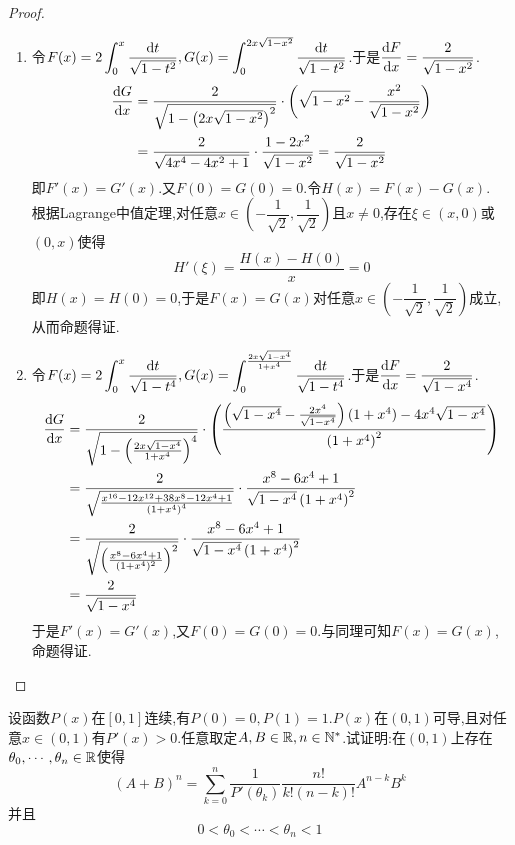 \documentclass{ctexart}
\begin{document}
\begin{proof}
    \begin{enumerate}[label=\tbf{(\arabic*)}]
        \item 令$\displaystyle F(x)=2\int_0^x\dfrac{\mathrm{d} t}{\sqrt{1-t^2}},G(x)=\int_0^{2x\sqrt{1-x^2}}\dfrac{\mathrm{d} t}{\sqrt{1-t^2}}$.于是$\dfrac{\mathrm{d} F}{\mathrm{d} x}=\dfrac{2}{\sqrt{1-x^2}}$.
            \[\begin{aligned}
                \dfrac{\mathrm{d} G}{\mathrm{d} x}
                &= \dfrac{2}{\sqrt{1-\left(2x\sqrt{1-x^2}\right)^2}}\cdot\left(\sqrt{1-x^2}-\dfrac{x^2}{\sqrt{1-x^2}}\right) \\
                &= \dfrac{2}{\sqrt{4x^4-4x^2+1}}\cdot\dfrac{1-2x^2}{\sqrt{1-x^2}}=\dfrac{2}{\sqrt{1-x^2}}
            \end{aligned}\]
            即$F'(x)=G'(x)$.又$F(0)=G(0)=0$.令$H(x)=F(x)-G(x)$.\\
            根据Lagrange中值定理,对任意$x\in\left(-\dfrac{1}{\sqrt2},\dfrac{1}{\sqrt2}\right)$且$x\neq0$,存在$\xi\in(x,0)$或$(0,x)$使得
            \[H'(\xi)=\dfrac{H(x)-H(0)}{x}=0\]
            即$H(x)=H(0)=0$,于是$F(x)=G(x)$对任意$x\in\left(-\dfrac{1}{\sqrt2},\dfrac{1}{\sqrt2}\right)$成立,从而命题得证.
        \item 令$\displaystyle F(x)=2\int_0^x\dfrac{\mathrm{d} t}{\sqrt{1-t^4}},G(x)=\int_{0}^{\frac{2x\sqrt{1-x^4}}{1+x^4}}\dfrac{\mathrm{d} t}{\sqrt{1-t^4}}$.于是$\dfrac{\mathrm{d} F}{\mathrm{d} x}=\dfrac{2}{\sqrt{1-x^4}}$.
            \[\begin{aligned}
                \dfrac{\mathrm{d} G}{\mathrm{d} x}
                &= \dfrac{2}{\sqrt{1-\left(\frac{2x\sqrt{1-x^4}}{1+x^4}\right)^4}}\cdot\left(\dfrac{\left(\sqrt{1-x^4}-\frac{2x^4}{\sqrt{1-x^4}}\right)(1+x^4)-4x^4\sqrt{1-x^4}}{\left(1+x^4\right)^2}\right) \\
                &= \dfrac{2}{\sqrt{\frac{x^{16}-12x^{12}+38x^8-12x^4+1}{\left(1+x^4\right)^4}}}\cdot\dfrac{x^8-6x^4+1}{\sqrt{1-x^4}\left(1+x^4\right)^2} \\
                &= \dfrac{2}{\sqrt{\left(\frac{x^8-6x^4+1}{(1+x^4)^2}\right)^2}}\cdot\dfrac{x^8-6x^4+1}{\sqrt{1-x^4}\left(1+x^4\right)^2} \\
                &= \dfrac{2}{\sqrt{1-x^4}}
            \end{aligned}\]
            于是$F'(x)=G'(x)$,又$F(0)=G(0)=0$.与同理可知$F(x)=G(x)$,命题得证.
    \end{enumerate}
\end{proof}
\begin{problem}[9.(15\songti{分})]
    设函数$P(x)$在$[0,1]$连续,有$P(0)=0,P(1)=1$.$P(x)$在$(0,1)$可导,且对任意$x\in(0,1)$有$P'(x)>0$.任意取定$A,B\in\mathbb{R},n\in\mathbb{N}^*$.试证明:在$(0,1)$上存在$\theta_0,\cdots,\theta_n\in\mathbb{R}$使得
    \[(A+B)^n=\sum_{k=0}^n\dfrac{1}{P'(\theta_k)}\dfrac{n!}{k!(n-k)!}A^{n-k}B^k\]
    并且\[0<\theta_0<\cdots<\theta_n<1\]
\end{problem}
\end{document}
